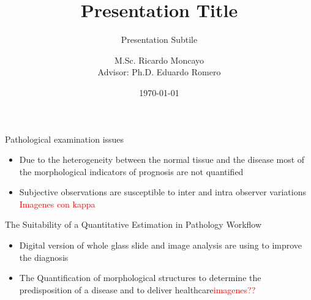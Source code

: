 \documentclass[usenames,dvipsnames]{beamer}
\author{M.Sc. Ricardo Moncayo\\Advisor: Ph.D. Eduardo Romero}
\title{Presentation Title}
\subtitle{Presentation Subtile}
\institute{Departamento Ingeniería \\ Eléctrica}
\date{\today}
\begin{document}
\begin{frame}[plain]
\maketitle
\small
{\centering\itshape \par}
\par\medskip

\end{frame}


\begin{frame}{Pathological examination issues}
	\begin{itemize}
	 \item Due to the heterogeneity between the normal tissue and the disease most of the morphological indicators of prognosis are not quantified
     \pause
	 \item Subjective observations are susceptible to inter and intra observer variations
      \textcolor{red}{Imagenes con kappa}	 
	 
	\end{itemize}
\end{frame}

\begin{frame}{The Suitability of a Quantitative Estimation in Pathology Workflow}
 \begin{itemize}
  \item Digital version of whole glass slide and image analysis are using to improve the diagnosis
  \pause

  \item The Quantification of morphological structures to determine the predisposition of a disease and to deliver healthcare\textcolor{red}{imagenes??}
  
  
  
 \end{itemize}
\end{frame}
\end{document}
